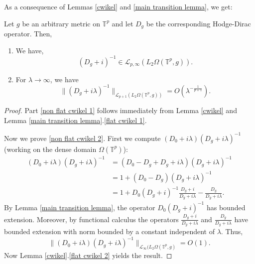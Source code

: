     As a consequence of Lemmas \ref{cwikel} and \ref{main transition lemma}, we get:
    \begin{cor}\label{non flat cwikel}
        Let $g$ be an arbitrary metric on $\mathbb{T}^p$ and let $D_g$ be the corresponding Hodge-Dirac operator. Then,
        \begin{enumerate}[{\rm (i)}]
            \item{}\label{non flat cwikel 1} We have,
                \begin{equation*}
                    (D_g+i)^{-1} \in \mathcal{L}_{p,\infty}(L_2\Omega(\mathbb{T}^p,g)).
                \end{equation*}
            \item{}\label{non flat cwikel 2} For $\lambda\to\infty$, we have
                \begin{equation*}
                    \|(D_g+i\lambda)^{-1}\|_{\mathcal{L}_{p+1}(L_2\Omega(\mathbb{T}^p,g))} = O(\lambda^{-\frac{1}{p+1}}).
                \end{equation*}
        \end{enumerate}
    \end{cor}
    \begin{proof}
        Part \eqref{non flat cwikel 1} follows immediately from Lemma \ref{cwikel} and Lemma \ref{main transition lemma}.\ref{flat cwikel 1}.
        
        Now we prove \eqref{non flat cwikel 2}. First we compute $(D_0+i\lambda)(D_g+i\lambda)^{-1}$ (working on the dense domain $\Omega(\mathbb{T}^p)$):
        \begin{align*}
            (D_0+i\lambda)(D_g+i\lambda)^{-1} &= (D_0-D_g+D_g+i\lambda)(D_g+i\lambda)^{-1}\\
                                              &= 1 + (D_0-D_g)(D_g+i\lambda)^{-1}\\
                                              &= 1+D_0(D_g+i)^{-1}\frac{D_g+i}{D_g+i\lambda} - \frac{D_g}{D_g+i\lambda}.
        \end{align*}
        By Lemma \ref{main transition lemma}, the operator $D_0(D_g+i)^{-1}$ has bounded extension. Moreover, by functional calculus
        the operators $\frac{D_g+i}{D_g+i\lambda}$ and $\frac{D_g}{D_g+i\lambda}$ have bounded extension with norm bounded by a constant independent of $\lambda$.
        Thus,
        \begin{equation*}
            \|(D_0+i\lambda)(D_g+i\lambda)^{-1}\|_{\mathcal{L}_\infty(L_2\Omega(\mathbb{T}^p,g)} = O(1).
        \end{equation*}
        Now Lemma \ref{cwikel}.\eqref{flat cwikel 2} yields the result.
    \end{proof}
        
